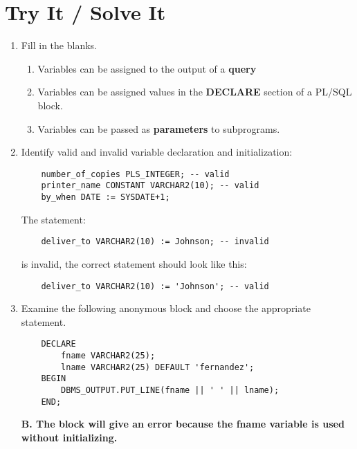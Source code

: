 \documentclass[11pt]{article}
\begin{document}
\section{Try It / Solve It}
\label{sec:org0a22489}
\begin{enumerate}
\item Fill in the blanks.
\begin{enumerate}
\item Variables can be assigned to the output of a \textbf{query}
\item Variables can be assigned values in the \textbf{DECLARE} section of a PL/SQL block.
\item Variables can be passed as \textbf{parameters} to subprograms.
\end{enumerate}

\item Identify valid and invalid variable declaration and initialization:
\begin{verbatim}
    number_of_copies PLS_INTEGER; -- valid
    printer_name CONSTANT VARCHAR2(10); -- valid
    by_when DATE := SYSDATE+1;
\end{verbatim}

The statement:
\begin{verbatim}
    deliver_to VARCHAR2(10) := Johnson; -- invalid
\end{verbatim}
is invalid, the correct statement should look like this:

\begin{verbatim}
    deliver_to VARCHAR2(10) := 'Johnson'; -- valid
\end{verbatim}

\item Examine the following anonymous block and choose the appropriate statement.
\begin{verbatim}
    DECLARE
        fname VARCHAR2(25);
        lname VARCHAR2(25) DEFAULT 'fernandez';
    BEGIN
        DBMS_OUTPUT.PUT_LINE(fname || ' ' || lname);
    END;
\end{verbatim}

\textbf{B. The block will give an error because the fname variable is used without initializing.}


\end{enumerate}
\end{document}
